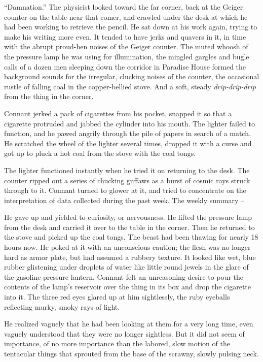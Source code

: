 \documentclass[ebook,oneside,11pt]{memoir}				%
\begin{document}
``Damnation.'' The physicist looked toward the far corner, back at the Geiger counter on the table near that comer, and crawled under the desk at which he had been working to retrieve the pencil. He sat down at his work again, trying to make his writing more even. It tended to have jerks and quavers in it, in time with the abrupt proud-hen noises of the Geiger counter. The muted whoosh of the pressure lamp he was using for illumination, the mingled gargles and bugle calls of a dozen men sleeping down the corridor in Paradise House formed the background sounds for the irregular, clucking noises of the counter, the occasional rustle of falling coal in the copper-bellied stove. And a soft, steady \emph{drip-drip-drip} from the thing in the corner.

Connant jerked a pack of cigarettes from his pocket, snapped it so that a cigarette protruded and jabbed the cylinder into his mouth. The lighter failed to function, and he pawed angrily through the pile of papers in search of a match. He scratched the wheel of the lighter several times, dropped it with a curse and got up to pluck a hot coal from the stove with the coal tongs.

The lighter functioned instantly when he tried it on returning to the desk. The counter ripped out a series of chucking guffaws as a burst of cosmic rays struck through to it. Connant turned to glower at it, and tried to concentrate on the interpretation of data collected during the past week. The weekly summary --

He gave up and yielded to curiosity, or nervousness. He lifted the pressure lamp from the desk and carried it over to the table in the corner. Then he returned to the stove and picked up the coal tongs. The beast had been thawing for nearly 18 hours now. He poked at it with an unconscious caution; the flesh was no longer hard as armor plate, but had assumed a rubbery texture. It looked like wet, blue rubber glistening under droplets of water like little round jewels in the glare of the gasoline pressure lantern. Connant felt an unreasoning desire to pour the contents of the lamp's reservoir over the thing in its box and drop the cigarette into it. The three red eyes glared up at him sightlessly, the ruby eyeballs reflecting murky, smoky rays of light.

He realized vaguely that he had been looking at them for a very long time, even vaguely understood that they were no longer sightless. But it did not seem of importance, of no more importance than the labored, slow motion of the tentacular things that sprouted from the base of the scrawny, slowly pulsing neck.
\end{document}
